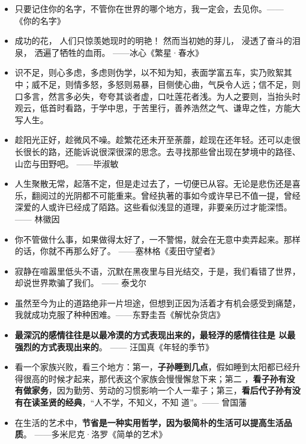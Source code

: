 \documentclass[UTF8,a4paper,8pt]{ctexart}
\begin{document}
\begin{itemize}
 	\item 只要记住你的名字，不管你在世界的哪个地方，我一定会，去见你。—— 《你的名字》
 	
 	\item 成功的花， 人们只惊羡她现时的明艳！ 然而当初她的芽儿， 浸透了奋斗的泪泉， 洒遍了牺牲的血雨。 ——冰心《繁星·春水》
 	
 	\item 识不足，则心多虑，多虑则伪学，以不知为知，表面学富五车，实乃败絮其中；威不足，则情多怒，多怒则易暴，目侧使心曲，气戾令人远；信不足，则口多言，然言多必失，夸夸其谈者虚，口吐莲花者浅。为人之要则，当抬头时观云，低首时看路，于学中思，于苦里行，善养浩然之气、谦卑之性，方能大写人生。
 	
 	\item 趁阳光正好，趁微风不噪。趁繁花还未开至荼蘼，趁现在还年轻。还可以走很长很长的路，还能诉说很深很深的思念。去寻找那些曾出现在梦境中的路径、山峦与田野吧。 ——毕淑敏
 	
 	\item 人生聚散无常，起落不定，但是走过去了，一切便已从容。无论是悲伤还是喜乐，翻阅过的光阴都不可能重来。曾经执著的事如今或许早已不值一提，曾经深爱的人或许已经成了陌路。这些看似浅显的道理，非要亲历过才能深悟。—— 林徽因
 	
 	\item 你不管做什么事，如果做得太好了，一不警惕，就会在无意中卖弄起来。那样的话，你就不再那么好了。	——塞林格《麦田守望者》
 	
 	\item 寂静在喧嚣里低头不语，沉默在黑夜里与目光结交，于是，我们看错了世界，却说世界欺骗了我们。 —— 泰戈尔
 	
 	\item 虽然至今为止的道路绝非一片坦途，但想到正因为活着才有机会感受到痛楚，我就成功克服了种种困难。——东野圭吾《解忧杂货店》
 	
 	\item \textbf{最深沉的感情往往是以最冷漠的方式表现出来的，最轻浮的感情往往是 以最强烈的方式表现出来的}。 —— 汪国真《年轻的季节》
 	
 	\item 看一个家族兴败，看三个地方：第一，\textbf{子孙睡到几点}，假如睡到太阳都已经升得很高的时候才起来，那代表这个家族会慢慢懈怠下来；第二 ，\textbf{看子孙有没有做家务}，因为勤劳、劳动的习惯影响一个人一辈子；第三，\textbf{看后代子孙有没有在读圣贤的经典}，“人不学，不知义，不知 道”。—— 曾国藩
 	
 	\item 在生活的艺术中，\textbf{节省是一种实用哲学，因为极简朴的生活可以提高生活品质}。	——多米尼克·洛罗《简单的艺术》
 	

\end{itemize}
\end{document}
